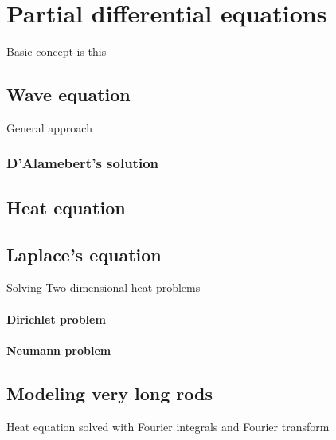 \section{Partial differential equations}
Basic concept is this

\subsection{Wave equation}
General approach

\subsubsection{D'Alamebert's solution}

\subsection{Heat equation}

\subsection{Laplace's equation}
Solving Two-dimensional heat problems

\paragraph{Dirichlet problem}
\paragraph{Neumann problem}

\subsection{Modeling very long rods}
Heat equation solved with Fourier integrals and Fourier transform
